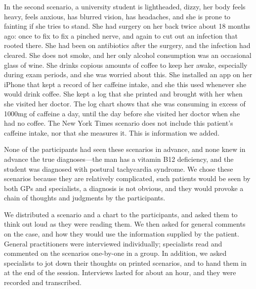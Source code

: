 \documentclass{sigchi}
\begin{document}
In the second scenario, a university student is lightheaded, dizzy, her body feels heavy, feels anxious, has blurred vision, has headaches, and she is prone to fainting if she tries to stand. She had surgery on her back twice about 18 months ago: once to fix to fix a pinched nerve, and again to cut out an infection that rooted there.  She had been on antibiotics after the surgery, and the infection had cleared.  She does not smoke, and her only alcohol consumption was an occasional glass of wine.  She drinks copious amounts of coffee to keep her awake, especially during exam periods, and she was worried about this.  She installed an app on her iPhone that kept a record of her caffeine intake, and she this used whenever she would drink coffee. She kept a log that she printed and brought with her when she visited her doctor. The log chart shows that she was consuming in excess of 1000mg of caffeine a day, until the day before she visited her doctor when she had no coffee.  The New York Times scenario does not include this patient’s caffeine intake, nor that she measures it.  This is information we added.

None of the participants had seen these scenarios in advance, and none knew in advance the true diagnoses—the man has a vitamin B12 deficiency, and the student was diagnosed with postural tachycardia syndrome.  We chose these scenarios because they are relatively complicated, such patients would be seen by both GPs and specialists, a diagnosis is not obvious, and they would provoke a chain of thoughts and judgments by the participants.

We distributed a scenario and a chart to the participants, and asked them to think out loud as they were reading them.  We then asked for general comments on the case, and how they would use the information supplied by the patient.  General practitioners were interviewed individually; specialists read and commented on the scenarios one-by-one in a group.  In addition, we asked specialists to jot down their thoughts on printed scenarios, and to hand them in at the end of the session.  Interviews lasted for about an hour, and they were recorded and transcribed.
\end{document}
